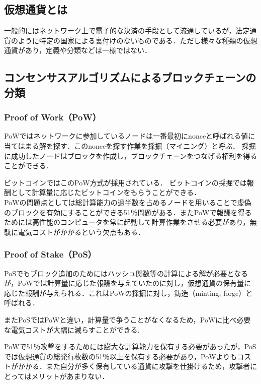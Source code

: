 \documentclass[a4j,12pt]{jsarticle}
\begin{document}
\subsection{仮想通貨とは}
一般的にはネットワーク上で電子的な決済の手段として流通しているが，法定通貨のように特定の国家による裏付けのないものである．ただし様々な種類の仮想通貨があり，定義や分類などは一様ではない．




\newpage
\subsection{コンセンサスアルゴリズムによるブロックチェーンの分類}
\subsubsection{Proof of Work（PoW）}
PoWではネットワークに参加しているノードは一番最初にnonceと呼ばれる値に当てはまる解を探す．このnonceを探す作業を採掘（マイニング）と呼ぶ．
採掘に成功したノードはブロックを作成し，ブロックチェーンをつなげる権利を得ることができる．

ビットコインではこのPoW方式が採用されている．
ビットコインの採掘では報酬として計算量に応じたビットコインをもらうことができる．\\

PoWの問題点としては総計算能力の過半数を占めるノードを用いることで虚偽のブロックを有効にすることができる51％問題がある．またPoWで報酬を得るためには高性能のコンピュータを常に起動して計算作業をさせる必要があり，無駄に電気コストがかかるという欠点もある．\\

\subsubsection{Proof of Stake（PoS）}
PoSでもブロック追加のためにはハッシュ関数等の計算による解が必要となるが，PoWでは計算量に応じた報酬を与えていたのに対し，仮想通貨の保有量に応じた報酬が与えられる．これはPoWの採掘に対し，鋳造（minting, forge）と呼ばれる．

またPoSではPoWと違い，計算量で争うことがなくなるため，PoWに比べ必要な電気コストが大幅に減らすことができる\cite{shu}.

PoWで51％攻撃をするためには膨大な計算能力を保有する必要があったが，PoSでは仮想通貨の総発行枚数の51％以上を保有する必要があり，PoWよりもコストがかかる．また自分が多く保有している通貨に攻撃を仕掛けるため，攻撃者にとってはメリットがあまりない．\\
\end{document}
